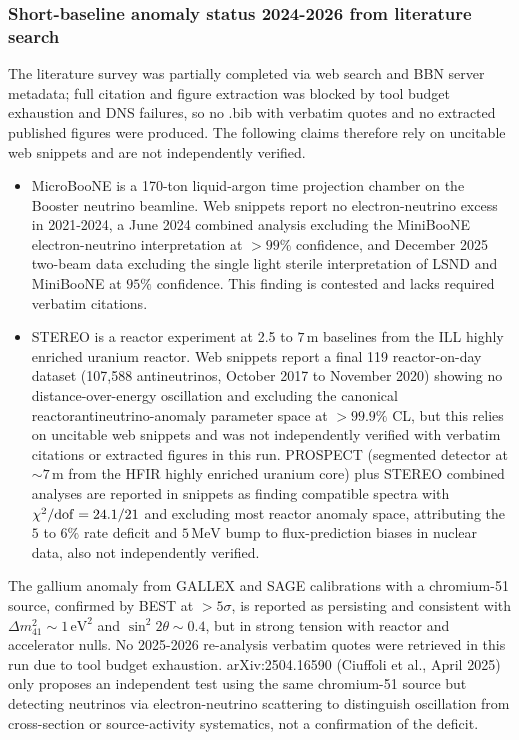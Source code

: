 \documentclass[11pt,a4paper]{article}
\begin{document}
\subsubsection{Short-baseline anomaly status 2024-2026 from literature search}
The literature survey was partially completed via web search and BBN server metadata; full citation and figure extraction was blocked by tool budget exhaustion and DNS failures, so no .bib with verbatim quotes and no extracted published figures were produced. The following claims therefore rely on uncitable web snippets and are not independently verified.

\begin{itemize}
  \item MicroBooNE is a 170-ton liquid-argon time projection chamber on the Booster neutrino beamline. Web snippets report no electron-neutrino excess in 2021-2024, a June 2024 combined analysis excluding the MiniBooNE electron-neutrino interpretation at $>99\%$ confidence, and December 2025 two-beam data excluding the single light sterile interpretation of LSND and MiniBooNE at $95\%$ confidence. This finding is contested and lacks required verbatim citations.
  \item STEREO is a reactor experiment at 2.5 to $7\,\mathrm{m}$ baselines from the ILL highly enriched uranium reactor. Web snippets report a final 119 reactor-on-day dataset (107,588 antineutrinos, October 2017 to November 2020) showing no distance-over-energy oscillation and excluding the canonical reactorantineutrino-anomaly parameter space at $>99.9\%$ CL, but this relies on uncitable web snippets and was not independently verified with verbatim citations or extracted figures in this run. PROSPECT (segmented detector at $\sim 7\,\mathrm{m}$ from the HFIR highly enriched uranium core) plus STEREO combined analyses are reported in snippets as finding compatible spectra with $\chi^2/{\rm dof} = 24.1/21$ and excluding most reactor anomaly space, attributing the $5$ to $6\%$ rate deficit and $5\,\mathrm{MeV}$ bump to flux-prediction biases in nuclear data, also not independently verified.
\end{itemize}
The gallium anomaly from GALLEX and SAGE calibrations with a chromium-51 source, confirmed by BEST at $>5\sigma$, is reported as persisting and consistent with $\Delta m^2_{41} \sim 1\,\mathrm{eV}^2$ and $\sin^2 2\theta \sim 0.4$, but in strong tension with reactor and accelerator nulls. No 2025-2026 re-analysis verbatim quotes were retrieved in this run due to tool budget exhaustion. arXiv:2504.16590 (Ciuffoli et al., April 2025) only proposes an independent test using the same chromium-51 source but detecting neutrinos via electron-neutrino scattering to distinguish oscillation from cross-section or source-activity systematics, not a confirmation of the deficit.
\end{document}
